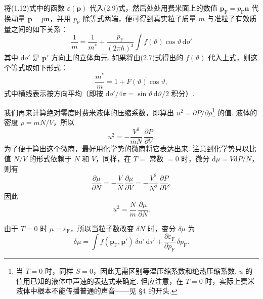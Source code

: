 将(1.12)式中的函数 $\varepsilon(\bm p)$ 代入(2.9)式，然后处处用费米面上的数值 $\bm p_{\mathrm F}=p_{\mathrm F}\bm n$ 代换动量 $\bm p=p\bm n$，并用 $p_{\mathrm F}$ 除等式两端，便可得到真实粒子质量 $m$ 与准粒子有效质量之间的如下关系：
\begin{equation}
\frac{1}{m}=\frac{1}{m^{*}}+\frac{p_{\mathrm F}}{(2\pi\hbar)^{3}}\int f(\vartheta)\cos\vartheta\,\mathrm{d}o'
\end{equation}
其中 $\mathrm{d}o'$ 是 $\bm p'$ 方向上的立体角元. 如果将由(2.7)式得出的 $f(\vartheta)$ 代入上式，则这个等式取如下形式：
\begin{equation}
\frac{m^{*}}{m}=1+\overline{F(\vartheta)\cos\vartheta},
\end{equation}
式中横线表示按方向平均（即按 $\mathrm{d}o'/4\pi=\sin\vartheta\,\mathrm{d}\vartheta/2$ 积分）.

我们再来计算绝对零度时费米液体的压缩系数，即算出 $u^{2}=\partial P/\partial\rho$\footnote{当 $T=0$ 时，同样 $S=0$，因此无需区别等温压缩系数和绝热压缩系数. $u$ 的值用已知的液体中声速的表达式来确定. 但应注意，在 $T=0$ 时，实际上费米液体中根本不能传播普通的声音——见 §4 的开头.} 的值. 液体的密度 $\rho=mN/V$，所以
\begin{equation*}
u^{2}=-\frac{V^{2}}{mN}\,\frac{\partial P}{\partial V}.
\end{equation*}
为了便于算出这个微商，最好用化学势的微商将它表达出来. 注意到化学势只以比值 $N/V$ 的形式依赖于 $N$ 和 $V$，同样，在 $T=$ 常数 $=0$ 时，微分 $\mathrm{d}\mu=V\mathrm{d}P/N$，则有
\begin{equation*}
\frac{\partial\mu}{\partial N}=-\frac{V}{N}\,\frac{\partial\mu}{\partial V}=-\frac{V^{2}}{N^{2}}\,\frac{\partial P}{\partial V},
\end{equation*}
因此
\begin{equation}
u^{2}=\frac{N}{m}\,\frac{\partial\mu}{\partial N}.
\end{equation}

由于 $T=0$ 时 $\mu=\varepsilon_{\mathrm F}$，所以当粒子数改变 $\delta N$ 时，变分 $\delta\mu$ 为
\begin{equation}
\delta\mu=\int f(\bm p_{\mathrm F},\bm p')\,\delta n'\,\mathrm{d}\tau'+\frac{\partial\varepsilon_{\mathrm F}}{\partial p_{\mathrm F}}\,\delta p_{\mathrm F}.
\end{equation}

